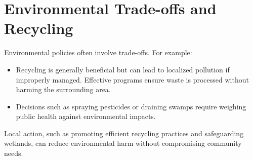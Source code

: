 \documentclass[12pt]{article}
\begin{document}
\section{Environmental Trade-offs and Recycling}
Environmental policies often involve trade-offs. For example:
\begin{itemize}
    \item Recycling is generally beneficial but can lead to localized pollution if improperly managed. Effective programs ensure waste is processed without harming the surrounding area.
    \item Decisions such as spraying pesticides or draining swamps require weighing public health against environmental impacts.
\end{itemize}

Local action, such as promoting efficient recycling practices and safeguarding wetlands, can reduce environmental harm without compromising community needs.
\end{document}
